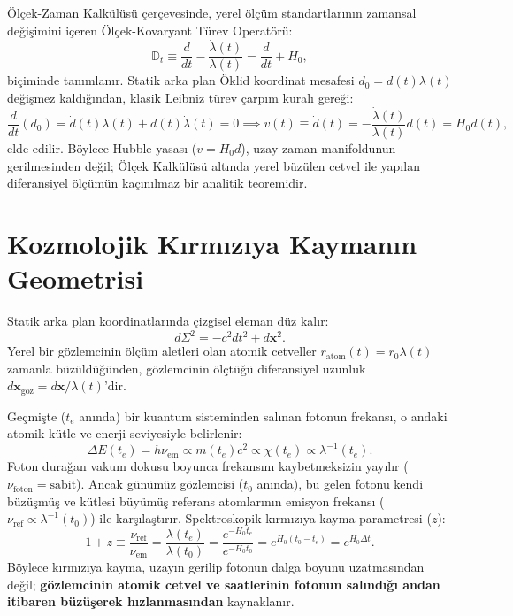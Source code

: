 \documentclass[11pt,a4paper]{article}
\begin{document}
Ölçek-Zaman Kalkülüsü çerçevesinde, yerel ölçüm standartlarının zamansal değişimini içeren Ölçek-Kovaryant Türev Operatörü:
\begin{equation}
    \mathbb{D}_t \equiv \frac{d}{dt} - \frac{\dot{\lambda}(t)}{\lambda(t)} = \frac{d}{dt} + H_0,
    \label{eq:olcek_turev_pantheon}
\end{equation}
biçiminde tanımlanır. Statik arka plan Öklid koordinat mesafesi $d_0 = d(t) \lambda(t)$ değişmez kaldığından, klasik Leibniz türev çarpım kuralı gereği:
\begin{equation}
    \frac{d}{dt}(d_0) = \dot{d}(t) \lambda(t) + d(t) \dot{\lambda}(t) = 0 \implies v(t) \equiv \dot{d}(t) = -\frac{\dot{\lambda}(t)}{\lambda(t)} d(t) = H_0 d(t),
    \label{eq:hubble_carpim_ispat}
\end{equation}
elde edilir. Böylece Hubble yasası ($v = H_0 d$), uzay-zaman manifoldunun gerilmesinden değil; Ölçek Kalkülüsü altında yerel büzülen cetvel ile yapılan diferansiyel ölçümün kaçınılmaz bir analitik teoremidir.

\section{Kozmolojik Kırmızıya Kaymanın Geometrisi}
\label{sec:redshift_geometrisi}

Statik arka plan koordinatlarında çizgisel eleman düz kalır:
\begin{equation}
    d\Sigma^2 = -c^2 dt^2 + d\mathbf{x}^2.
    \label{eq:statik_cizgisel}
\end{equation}
Yerel bir gözlemcinin ölçüm aletleri olan atomik cetveller $r_{\mathrm{atom}}(t) = r_0 \lambda(t)$ zamanla büzüldüğünden, gözlemcinin ölçtüğü diferansiyel uzunluk $d\mathbf{x}_{\mathrm{goz}} = d\mathbf{x} / \lambda(t)$'dir.

Geçmişte ($t_e$ anında) bir kuantum sisteminden salınan fotonun frekansı, o andaki atomik kütle ve enerji seviyesiyle belirlenir:
\begin{equation}
    \Delta E(t_e) = h \nu_{\mathrm{em}} \propto m(t_e) c^2 \propto \chi(t_e) \propto \lambda^{-1}(t_e).
\end{equation}
Foton durağan vakum dokusu boyunca frekansını kaybetmeksizin yayılır ($\nu_{\mathrm{foton}} = \text{sabit}$). Ancak günümüz gözlemcisi ($t_0$ anında), bu gelen fotonu kendi büzüşmüş ve kütlesi büyümüş referans atomlarının emisyon frekansı ($\nu_{\mathrm{ref}} \propto \lambda^{-1}(t_0)$) ile karşılaştırır. Spektroskopik kırmızıya kayma parametresi ($z$):
\begin{equation}
    1 + z \equiv \frac{\nu_{\mathrm{ref}}}{\nu_{\mathrm{em}}} = \frac{\lambda(t_e)}{\lambda(t_0)} = \frac{e^{-H_0 t_e}}{e^{-H_0 t_0}} = e^{H_0 (t_0 - t_e)} = e^{H_0 \Delta t}.
    \label{eq:redshift_analitik}
\end{equation}
Böylece kırmızıya kayma, uzayın gerilip fotonun dalga boyunu uzatmasından değil; \textbf{gözlemcinin atomik cetvel ve saatlerinin fotonun salındığı andan itibaren büzüşerek hızlanmasından} kaynaklanır.
\end{document}
